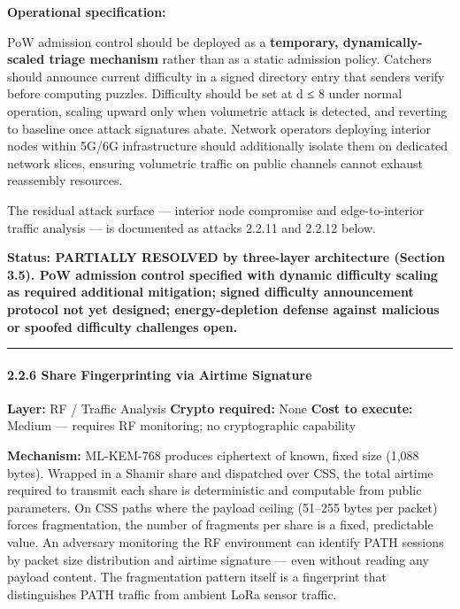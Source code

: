 \documentclass[
  11pt,
]{article}
\begin{document}
\textbf{Operational specification:}

PoW admission control should be deployed as a \textbf{temporary,
dynamically-scaled triage mechanism} rather than as a static admission
policy. Catchers should announce current difficulty in a signed
directory entry that senders verify before computing puzzles. Difficulty
should be set at d ≤ 8 under normal operation, scaling upward only when
volumetric attack is detected, and reverting to baseline once attack
signatures abate. Network operators deploying interior nodes within
5G/6G infrastructure should additionally isolate them on dedicated
network slices, ensuring volumetric traffic on public channels cannot
exhaust reassembly resources.

The residual attack surface --- interior node compromise and
edge-to-interior traffic analysis --- is documented as attacks 2.2.11
and 2.2.12 below.

\textbf{Status: PARTIALLY RESOLVED by three-layer architecture (Section
3.5). PoW admission control specified with dynamic difficulty scaling as
required additional mitigation; signed difficulty announcement protocol
not yet designed; energy-depletion defense against malicious or spoofed
difficulty challenges open.}

\begin{center}\rule{0.5\linewidth}{0.5pt}\end{center}

\hypertarget{share-fingerprinting-via-airtime-signature}{%
\paragraph{2.2.6 Share Fingerprinting via Airtime
Signature}\label{share-fingerprinting-via-airtime-signature}}

\textbf{Layer:} RF / Traffic Analysis \textbf{Crypto required:} None
\textbf{Cost to execute:} Medium --- requires RF monitoring; no
cryptographic capability

\textbf{Mechanism:} ML-KEM-768 produces ciphertext of known, fixed size
(1,088 bytes). Wrapped in a Shamir share and dispatched over CSS, the
total airtime required to transmit each share is deterministic and
computable from public parameters. On CSS paths where the payload
ceiling (51--255 bytes per packet) forces fragmentation, the number of
fragments per share is a fixed, predictable value. An adversary
monitoring the RF environment can identify PATH sessions by packet size
distribution and airtime signature --- even without reading any payload
content. The fragmentation pattern itself is a fingerprint that
distinguishes PATH traffic from ambient LoRa sensor traffic.
\end{document}
